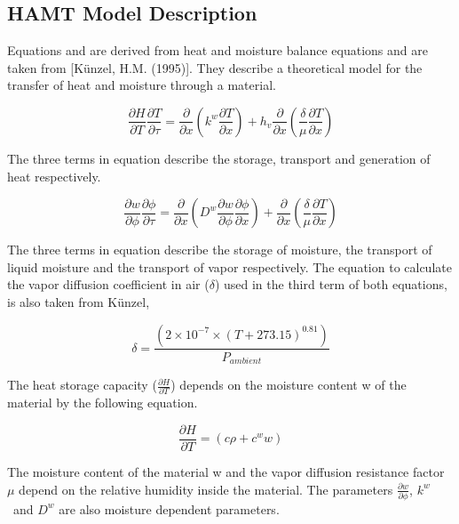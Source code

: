 \subsection{HAMT Model Description}\label{hamt-model-description}

Equations and are derived from heat and moisture balance equations and are taken from {[}Künzel, H.M. (1995){]}. They describe a theoretical model for the transfer of heat and moisture through a material.

\begin{equation}
\frac{{\partial H}}{{\partial T}}\frac{{\partial T}}{{\partial \tau }} = \frac{\partial }{{\partial x}}\left( {{k^w}\frac{{\partial T}}{{\partial x}}} \right) + {h_v}\frac{\partial }{{\partial x}}\left( {\frac{\delta }{\mu }\frac{{\partial T}}{{\partial x}}} \right)
\end{equation}

The three terms in equation describe the storage, transport and generation of heat respectively.

\begin{equation}
\frac{{\partial w}}{{\partial \phi }}\frac{{\partial \phi }}{{\partial \tau }} = \frac{\partial }{{\partial x}}\left( {{D^w}\frac{{\partial w}}{{\partial \phi }}\frac{{\partial \phi }}{{\partial x}}} \right) + \frac{\partial }{{\partial x}}\left( {\frac{\delta }{\mu }\frac{{\partial T}}{{\partial x}}} \right)
\end{equation}

The three terms in equation describe the storage of moisture, the transport of liquid moisture and the transport of vapor respectively. The equation to calculate the vapor diffusion coefficient in air (\(\delta\)) used in the third term of both equations, is also taken from Künzel,

\begin{equation}
\delta  = \frac{{\left( {2 \times {{10}^{ - 7}} \times {{\left( {T + 273.15} \right)}^{0.81}}} \right)}}{{{P_{ambient}}}}
\end{equation}

The heat storage capacity (\(\frac{\partial H}{\partial T}\)) depends on the moisture content w of the material by the following equation.

\begin{equation}
\frac{{\partial H}}{{\partial T}} = \left( {c\rho  + {c^w}w} \right)
\end{equation}

The moisture content of the material w and the vapor diffusion resistance factor $\mu$ depend on the relative humidity inside the material. The parameters \(\frac{\partial w}{\partial \phi}\), \({k^w}\) ~and \({D^w}\) are also moisture dependent parameters.

